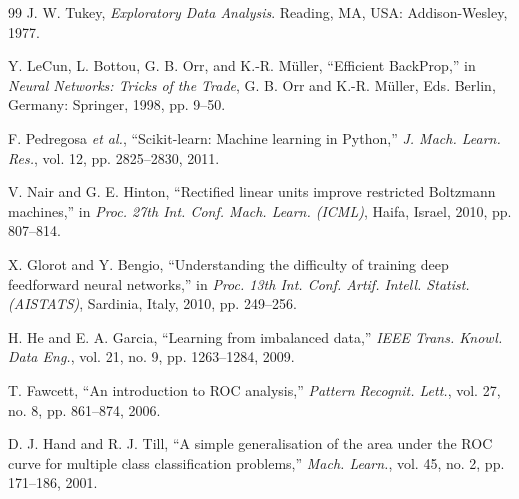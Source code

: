 \begin{thebibliography}{99}
J. W. Tukey, \emph{Exploratory Data Analysis}. Reading, MA, USA: Addison-Wesley, 1977.

Y. LeCun, L. Bottou, G. B. Orr, and K.-R. M\"{u}ller, ``Efficient BackProp,'' in \emph{Neural Networks: Tricks of the Trade}, G. B. Orr and K.-R. M\"{u}ller, Eds. Berlin, Germany: Springer, 1998, pp. 9--50.

F. Pedregosa \emph{et al.}, ``Scikit-learn: Machine learning in Python,'' \emph{J. Mach. Learn. Res.}, vol. 12, pp. 2825--2830, 2011.

V. Nair and G. E. Hinton, ``Rectified linear units improve restricted Boltzmann machines,'' in \emph{Proc. 27th Int. Conf. Mach. Learn. (ICML)}, Haifa, Israel, 2010, pp. 807--814.

X. Glorot and Y. Bengio, ``Understanding the difficulty of training deep feedforward neural networks,'' in \emph{Proc. 13th Int. Conf. Artif. Intell. Statist. (AISTATS)}, Sardinia, Italy, 2010, pp. 249--256.

H. He and E. A. Garcia, ``Learning from imbalanced data,'' \emph{IEEE Trans. Knowl. Data Eng.}, vol. 21, no. 9, pp. 1263--1284, 2009.

T. Fawcett, ``An introduction to ROC analysis,'' \emph{Pattern Recognit. Lett.}, vol. 27, no. 8, pp. 861--874, 2006.

D. J. Hand and R. J. Till, ``A simple generalisation of the area under the ROC curve for multiple class classification problems,'' \emph{Mach. Learn.}, vol. 45, no. 2, pp. 171--186, 2001.

\end{thebibliography}
